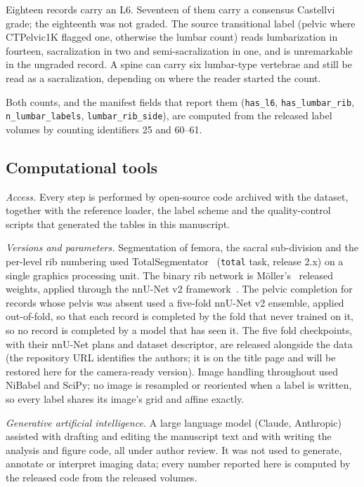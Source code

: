 \documentclass[aapm,mph,amsmath,amssymb,reprint]{revtex4-2}
\newif\ifreview \reviewtrue
\begin{document}
Eighteen records carry an L6. Seventeen of them carry a consensus Castellvi grade;
the eighteenth was not graded. The source transitional label (pelvic where CTPelvic1K flagged one, otherwise the lumbar count) reads lumbarization in fourteen, sacralization in two and semi-sacralization in one, and is unremarkable in the ungraded record. A spine can carry six lumbar-type vertebrae and still be read as a sacralization, depending on where the reader started the count.

Both counts, and the manifest fields that report them (\texttt{has\_l6},
\texttt{has\_lumbar\_rib}, \texttt{n\_lumbar\_labels}, \texttt{lumbar\_rib\_side}), are
computed from the released label volumes by counting identifiers 25 and 60--61.

\subsection{Computational tools}

\emph{Access.} Every step is performed by open-source code archived with the dataset,
together with the reference loader, the label scheme and the quality-control scripts that
generated the tables in this manuscript.

\emph{Versions and parameters.} Segmentation of femora, the sacral sub-division and the
per-level rib numbering used TotalSegmentator~\cite{totalsegmentator} (\texttt{total} task,
release 2.x) on a single graphics processing unit. The binary rib network is
M\"oller's~\cite{moller2026} released weights, applied through the nnU-Net v2
framework~\cite{nnunet}. The pelvic completion for records whose pelvis was absent used a
five-fold nnU-Net v2 ensemble, applied out-of-fold, so that each record is completed by the fold that
never trained on it, so no record is completed by a model that has seen it. The five fold
checkpoints, with their nnU-Net plans and dataset descriptor, are released alongside the
data (\ifreview the repository URL identifies the authors; it is on the title page and will be
restored here for the camera-ready version\else\url{https://huggingface.co/OpenSpineConsortium/spinopelvic-seg-checkpoints}, trained with \url{https://github.com/Gregory-Schwing-MD-PhD/spinesurg-ct-nnunet} at commit 50b209f\fi). Image handling
throughout used NiBabel and SciPy; no image is resampled or reoriented when a label is
written, so every label shares its image's grid and affine exactly.

\emph{Generative artificial intelligence.} A large language model (Claude, Anthropic)
assisted with drafting and editing the manuscript text and with writing the analysis and
figure code, all under author review. It was not used to generate, annotate or interpret
imaging data; every number reported here is computed by the released code from the
released volumes.
\end{document}
